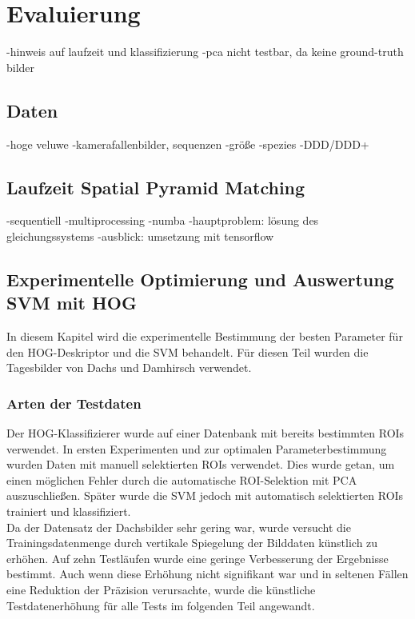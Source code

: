 \section{Evaluierung}
\label{sec:eval}

-hinweis auf laufzeit und klassifizierung
-pca nicht testbar, da keine ground-truth bilder

\subsection{Daten}

-hoge veluwe
-kamerafallenbilder, sequenzen
-größe
-spezies
-DDD/DDD+

\subsection{Laufzeit Spatial Pyramid Matching}

-sequentiell
-multiprocessing
-numba
-hauptproblem: lösung des gleichungssystems
-ausblick: umsetzung mit tensorflow

\subsection{Experimentelle Optimierung und Auswertung SVM mit HOG} \label{sec:HOG_parameter_and_results}
In diesem Kapitel wird die experimentelle Bestimmung der besten Parameter für den HOG-Deskriptor und die SVM behandelt. Für diesen Teil wurden die Tagesbilder von Dachs und Damhirsch verwendet.


\subsubsection{Arten der Testdaten} \label{sssec:test_data_HOG}
Der HOG-Klassifizierer wurde auf einer Datenbank mit bereits bestimmten ROIs verwendet. In ersten Experimenten und zur optimalen Parameterbestimmung wurden Daten mit manuell selektierten ROIs verwendet. Dies wurde getan, um einen möglichen Fehler durch die automatische ROI-Selektion mit PCA auszuschließen. Später wurde die SVM jedoch mit automatisch selektierten ROIs trainiert und klassifiziert.\\ 
Da der Datensatz der Dachsbilder sehr gering war, wurde versucht die Trainingsdatenmenge durch vertikale Spiegelung der Bilddaten künstlich zu erhöhen. Auf zehn Testläufen wurde eine geringe Verbesserung der Ergebnisse bestimmt. Auch wenn diese Erhöhung nicht signifikant war und in seltenen Fällen eine Reduktion der Präzision verursachte, wurde die künstliche Testdatenerhöhung für alle Tests im folgenden Teil angewandt. 

